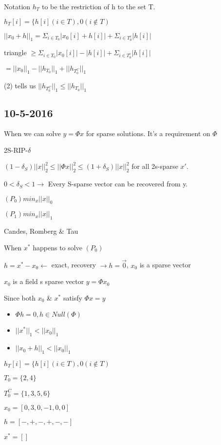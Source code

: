 \documentclass[12pt,letterpaper]{report}
\begin{document}
Notation $h_T$ to be the restriction of h to the set T.

$h_T[i] = \{ h[i] (i \in T), 0 (i \not\in T)$

$||x_0 + h||_1 = \Sigma_{i \in T_0} |x_0[i] + h[i]| + \Sigma_{i \in T_0^c}|h[i]|$

triangle $\geq \Sigma_{i \in T_0} |x_0[i]| - |h[i]| + \Sigma_{i \in T_0^c}|h[i]|$

$= ||x_0||_1 - ||h_{T_0}||_1 + ||h_{T_0^C}||_1$

(2) tells us $||h_{T_0^C}||_1 \leq ||h_{T_0}||_1$


\subsection*{10-5-2016}

When we can solve $y = \Phi x$ for sparse solutions.  It's a requirement on $\Phi$

2S-RIP-$\delta$

$(1-\delta_S)||x||_2^2 \leq ||\Phi x||_2^2 \leq (1+\delta_S)||x||_2^2$ for all 2s-sparse $x'$.

$0 < \delta_S < 1 \rightarrow$ Every S-sparse vector can be recovered from y.


$(P_0) min_x ||x||_0$

$(P_1) min_x ||x||_1$

Candes, Romberg \& Tau

When $x^*$ happens to solve $(P_0)$

$h = x^* - x_0 \leftarrow$ exact, recovery $\rightarrow h = \vec{0}$, $x_0$ is a sparse vector

$x_0$ is a field s sparse vector $y = \Phi x_0$

Since both $x_0$ \& $x^*$ satisfy $\Phi x = y$

\begin{itemize}
\item $\Phi h = 0, h \in Null(\Phi)$
\item $||x^*||_1 < ||x_0||_1$
\item $||x_0 + h||_1 < ||x_0||_1$
\end{itemize}

$h_T[i] = \{ h[i] (i \in T), 0 (i \not\in T)$


$T_0 = \{2,4\}$

$T_0^C = \{1,3,5,6\}$

$x_0 = [0, 3, 0, -1, 0, 0]$

$h = [-, +, -, +, -, -]$

$x^* = [ ]$
\end{document}
